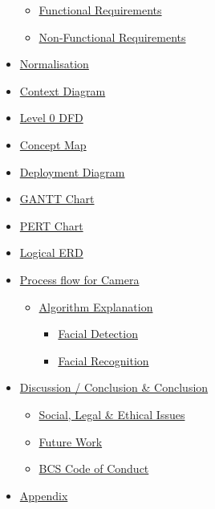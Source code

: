 \documentclass[
  english,
  a4paper,
,tablecaptionabove
]{scrartcl}
\providecommand{\tightlist}{%
  \setlength{\itemsep}{0pt}\setlength{\parskip}{0pt}}
\begin{document}
\begin{itemize}
  \begin{itemize}
  \tightlist
  \item
    \protect\hyperlink{functional-requirements}{Functional Requirements}
  \item
    \protect\hyperlink{non-functional-requirements}{Non-Functional
    Requirements}
  \end{itemize}
\item
  \protect\hyperlink{normalisation}{Normalisation}
\item
  \protect\hyperlink{context-diagram}{Context Diagram}
\item
  \protect\hyperlink{level0dfd}{Level 0 DFD}
\item
  \protect\hyperlink{cmap}{Concept Map}
\item
  \protect\hyperlink{deployment-diagram}{Deployment Diagram}
\item
  \protect\hyperlink{gantt-chart}{GANTT Chart}
\item
  \protect\hyperlink{pert-chart}{PERT Chart}
\item
  \protect\hyperlink{logical-erd}{Logical ERD}
\item
  \protect\hyperlink{process-flow-for-camera}{Process flow for Camera}

  \begin{itemize}
  \tightlist
  \item
    \protect\hyperlink{algorithm-explanation}{Algorithm Explanation}

    \begin{itemize}
    \tightlist
    \item
      \protect\hyperlink{facial-detection}{Facial Detection}
    \item
      \protect\hyperlink{facial-recognition}{Facial Recognition}
    \end{itemize}
  \end{itemize}
\item
  \protect\hyperlink{discussion--conclusion}{Discussion / Conclusion \&
  Conclusion}

  \begin{itemize}
  \tightlist
  \item
    \protect\hyperlink{social-legal--ethical-issues}{Social, Legal \&
    Ethical Issues}
  \item
    \protect\hyperlink{future-work}{Future Work}
  \item
    \protect\hyperlink{bcs-code-of-conduct}{BCS Code of Conduct}
  \end{itemize}
\item
  \protect\hyperlink{appendix}{Appendix}


\end{itemize}
\end{document}
